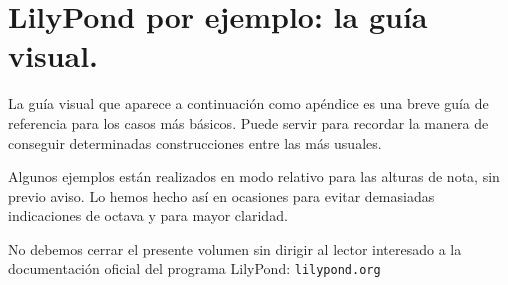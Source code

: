 \section{LilyPond por ejemplo: la guía visual.}

La guía visual que aparece a continuación como apéndice es una breve
guía de referencia para los casos más básicos. Puede servir para
recordar la manera de conseguir determinadas construcciones entre las
más usuales.

Algunos ejemplos están realizados en modo relativo para las alturas de
nota, sin previo aviso. Lo hemos hecho así en ocasiones para evitar
demasiadas indicaciones de octava y para mayor claridad.

No debemos cerrar el presente volumen sin dirigir al lector interesado
a la documentación oficial del programa LilyPond:  \texttt{lilypond.org }


